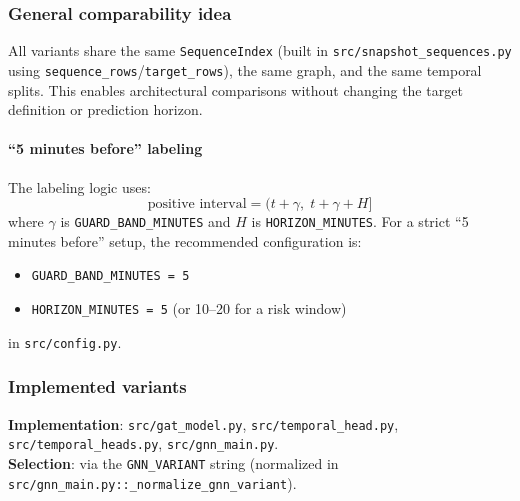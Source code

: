 \subsubsection{General comparability idea}
All variants share the same \texttt{SequenceIndex} (built in
\texttt{src/snapshot\_sequences.py} using \texttt{sequence\_rows}/\texttt{target\_rows}),
the same graph, and the same temporal splits. This enables architectural comparisons
without changing the target definition or prediction horizon.

\paragraph{``5 minutes before'' labeling}
The labeling logic uses:
\[
\text{positive interval} = (t+\gamma,\; t+\gamma+H]
\]
where \(\gamma\) is \texttt{GUARD\_BAND\_MINUTES} and \(H\) is \texttt{HORIZON\_MINUTES}.
For a strict ``5 minutes before'' setup, the recommended configuration is:
\begin{itemize}[leftmargin=*]
  \item \texttt{GUARD\_BAND\_MINUTES = 5}
  \item \texttt{HORIZON\_MINUTES = 5} (or 10--20 for a risk window)
\end{itemize}
in \texttt{src/config.py}.

\subsubsection{Implemented variants}
\textbf{Implementation}: \texttt{src/gat\_model.py}, \texttt{src/temporal\_head.py},
\texttt{src/temporal\_heads.py}, \texttt{src/gnn\_main.py}.\\
\textbf{Selection}: via the \texttt{GNN\_VARIANT} string (normalized in
\texttt{src/gnn\_main.py::\_normalize\_gnn\_variant}).

